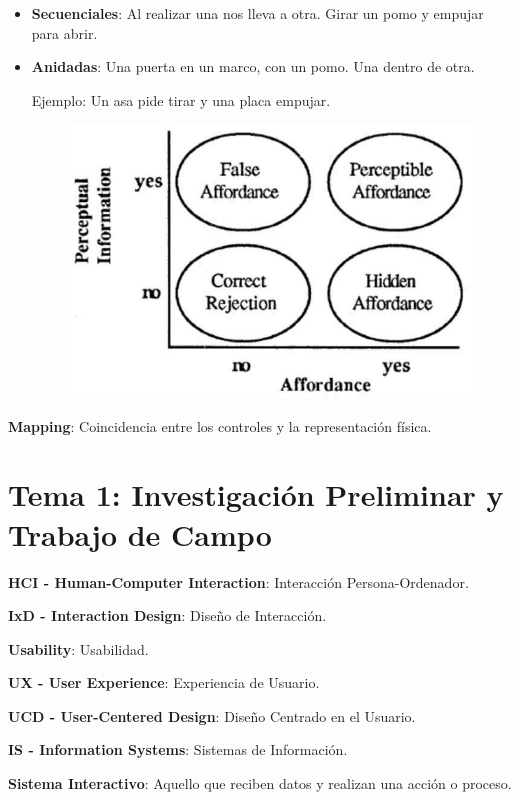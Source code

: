 \documentclass[12pt, twoside, openright]{report} %
\begin{document}
\begin{itemize}
	\item \textbf{Secuenciales}: Al realizar una nos lleva a otra. Girar un pomo
	      y empujar para abrir.
	\item \textbf{Anidadas}: Una puerta en un marco, con un pomo. Una dentro de
	      otra.

	      Ejemplo: Un asa pide tirar y una placa empujar.
	      \begin{figure}[H]
		      {\includegraphics[scale=.4]{Untitled.png}}
	      \end{figure}
\end{itemize}

\textbf{Mapping}: Coincidencia entre los controles y la representación
física.

\chapter{Tema 1: Investigación Preliminar y Trabajo de Campo}

\textbf{HCI - Human-Computer Interaction}: Interacción
Persona-Ordenador.

\textbf{IxD - Interaction Design}: Diseño de Interacción.

\textbf{Usability}: Usabilidad.

\textbf{UX - User Experience}: Experiencia de Usuario.

\textbf{UCD - User-Centered Design}: Diseño Centrado en el Usuario.

\textbf{IS - Information Systems}: Sistemas de Información.

\textbf{Sistema Interactivo}: Aquello que reciben datos y realizan una
acción o proceso.
\end{document}
